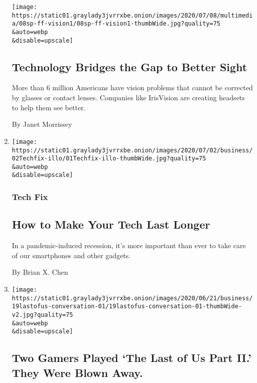 \begin{enumerate}
  \texttt{[image: https://static01.graylady3jvrrxbe.onion/images/2020/07/08/multimedia/08sp-ff-vision1/08sp-ff-vision1-thumbWide.jpg?quality=75\\\&auto=webp\\\&disable=upscale]}

  \hypertarget{technology-bridges-the-gap-to-better-sight}{%
  \subsection{Technology Bridges the Gap to Better
  Sight}\label{technology-bridges-the-gap-to-better-sight}}

  More than 6 million Americans have vision problems that cannot be
  corrected by glasses or contact lenses. Companies like IrisVision are
  creating headsets to help them see better.

  By Janet Morrissey
\item
  \href{/2020/07/01/technology/personaltech/make-your-tech-last-longer.html}{}

  \texttt{[image: https://static01.graylady3jvrrxbe.onion/images/2020/07/02/business/02Techfix-illo/01Techfix-illo-thumbWide.jpg?quality=75\\\&auto=webp\\\&disable=upscale]}

  \hypertarget{tech-fix-1}{%
  \subsubsection{Tech Fix}\label{tech-fix-1}}

  \hypertarget{how-to-make-your-tech-last-longer}{%
  \subsection{How to Make Your Tech Last
  Longer}\label{how-to-make-your-tech-last-longer}}

  In a pandemic-induced recession, it's more important than ever to take
  care of our smartphones and other gadgets.

  By Brian X. Chen
\item
  \href{/2020/06/19/technology/last-of-us-2-gameplay.html}{}

  \texttt{[image: https://static01.graylady3jvrrxbe.onion/images/2020/06/21/business/19lastofus-conversation-01/19lastofus-conversation-01-thumbWide-v2.jpg?quality=75\\\&auto=webp\\\&disable=upscale]}

  \hypertarget{two-gamers-played-the-last-of-us-part-ii-they-were-blown-away}{%
  \subsection{Two Gamers Played `The Last of Us Part II.' They Were
  Blown
  Away.}\label{two-gamers-played-the-last-of-us-part-ii-they-were-blown-away}}


\end{enumerate}
